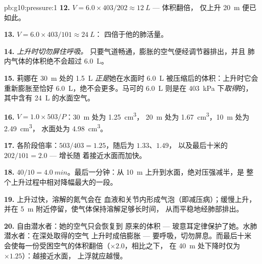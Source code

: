 \begin{solution}{pb:g10:pressure:1}
\textbf{12.} $V = 6.0 \times 403/202 \approx \qty{12}{L}$ --- 体积翻倍，
仅上升 \qty{20}{m} 便已如此。

\textbf{13.} $V = 6.0 \times 403/101 \approx \qty{24}{L}$：
四倍于他的肺活量。

\textbf{14.} \emph{上升时切勿屏住呼吸。}
只要气道畅通，膨胀的空气便经调节器排出，并且
肺内气体的体积绝不会超过 \qty{6.0}{L}。

\textbf{15.} 莉娜在 \qty{30}{m} 处的 \qty{1.5}{L} \emph{正是}她在水面时
\qty{6.0}{L} 被压缩后的体积：上升时它会重新膨胀至恰好
\qty{6.0}{L}，绝不会更多。马可的 \qty{6.0}{L} 则是在
\qty{403}{kPa} 下\emph{取得}的，其中含有 \qty{24}{L} 的水面空气。

\textbf{16.} $V = 1.0 \times 503/P$：\qty{30}{m} 处为 \qty{1.25}{cm^3}，
\qty{20}{m} 处为 \qty{1.67}{cm^3}，\qty{10}{m} 处为 \qty{2.49}{cm^3}，
水面处为 \qty{4.98}{cm^3}。

\textbf{17.} 各阶段倍率：$503/403 = 1.25$，随后为 $1.33$、$1.49$，
以及最后十米的 $202/101 = 2.0$ --- 增长随
着接近水面而加快。

\textbf{18.} $40/10 = \qty{4.0}{min}$。最后一分钟：从
\qty{10}{m} 上升到水面，绝对压强减半，是
整个上升过程中相对降幅最大的一段。

\textbf{19.} 上升过快，溶解的氮气会在
血液和关节内形成气泡（即减压病）；缓慢上升，
并在 \qty{5}{m} 附近停留，使气体保持溶解足够长时间，
从而平稳地经肺部排出。

\textbf{20.} 自由潜水者：她的空气只会恢复到
原来的体积 --- 玻意耳定律保护了她。水肺潜水者：在深处取得的空气
上升时成倍膨胀 --- 要呼吸，切勿屏息。而最后十米
会使每一份受困空气的体积翻倍（$\times 2.0$，相比之下，
在 \qty{40}{m} 处下降时仅为 $\times 1.25$）：越接近水面，
上浮就应越慢。
\end{solution}
